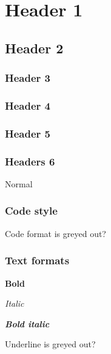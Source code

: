 \documentclass{article}
\begin{document}
\section{Header 1}\label{H4490657}



\subsection{Header 2}\label{H8419696}



\subsubsection{Header 3}\label{H8916798}



\subsubsection{Header 4}\label{H7079173}



\subsubsection{Header 5}\label{H2991838}



\subsubsection{Headers 6}\label{H2402273}



Normal


\subsubsection{Code style}\label{H2805208}



Code format is greyed out?


\subsubsection{Text formats}\label{H9315252}



\textbf{Bold}


\emph{Italic}


\emph{\textbf{Bold italic}}


Underline is greyed out?
\end{document}
